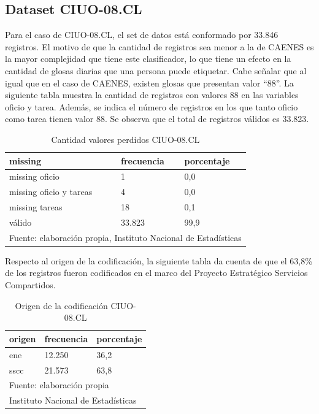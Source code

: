 \documentclass[
  12pt,
  spanish,
]{article}
\begin{document}
\hypertarget{dataset-ciuo-08.cl-1}{%
\subsection{Dataset CIUO-08.CL}\label{dataset-ciuo-08.cl-1}}

Para el caso de CIUO-08.CL, el set de datos está conformado por 33.846
registros. El motivo de que la cantidad de registros sea menor a la de
CAENES es la mayor complejidad que tiene este clasificador, lo que tiene
un efecto en la cantidad de glosas diarias que una persona puede
etiquetar. Cabe señalar que al igual que en el caso de CAENES, existen
glosas que presentan valor ``88''. La siguiente tabla muestra la
cantidad de registros con valores 88 en las variables oficio y tarea.
Además, se indica el número de registros en los que tanto oficio como
tarea tienen valor 88. Se observa que el total de registros válidos es
33.823.

\begin{table}[H]

\caption{\label{tab:ciuo valores missing}\label{missing_ciuo}Cantidad valores perdidos CIUO-08.CL}
\centering
\fontsize{9.5}{11.5}\selectfont
\begin{tabular}[t]{lll}
\toprule
missing & frecuencia & porcentaje\\
\midrule
missing oficio & 1 & 0,0\\
missing oficio y tareas & 4 & 0,0\\
missing tareas & 18 & 0,1\\
válido & 33.823 & 99,9\\
\bottomrule
\multicolumn{3}{l}{\rule{0pt}{1em}Fuente: elaboración propia, Instituto Nacional de Estadísticas }\\
\end{tabular}
\end{table}

Respecto al origen de la codificación, la siguiente tabla da cuenta de
que el 63,8\% de los registros fueron codificados en el marco del
Proyecto Estratégico Servicios Compartidos.

\begin{table}[H]

\caption{\label{tab:crear tabla origen ciuo}\label{origen_ciuo}Origen de la codificación CIUO-08.CL}
\centering
\fontsize{9.5}{11.5}\selectfont
\begin{tabular}[t]{lll}
\toprule
origen & frecuencia & porcentaje\\
\midrule
ene & 12.250 & 36,2\\
sscc & 21.573 & 63,8\\
\bottomrule
\multicolumn{3}{l}{\rule{0pt}{1em}Fuente: elaboración propia}\\
\multicolumn{3}{l}{\rule{0pt}{1em}Instituto Nacional de Estadísticas}\\
\end{tabular}
\end{table}
\end{document}
